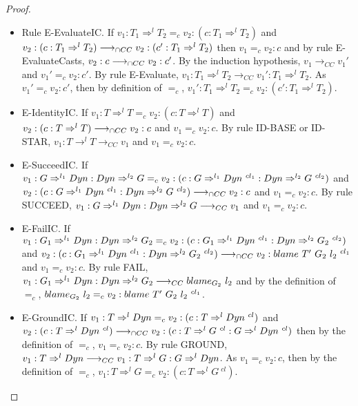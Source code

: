\documentclass[a4paper]{article}
\begin{document}
\begin{proof}
\begin{itemize}
\begin{itemize}
\begin{itemize}
            \item Rule E-EvaluateIC.
            If $v_1 : T_1 \Rightarrow^l T_2 =_c v_2 : (c : T_1 \Rightarrow^l T_2)$ and $v_2 : (c : T_1 \Rightarrow^l T_2) \longrightarrow_{\cap CC} v_2 : (c' : T_1 \Rightarrow^l T_2)$ then $v_1 =_c v_2 : c$ and by rule E-EvaluateCasts, $v_2 : c \longrightarrow_{\cap CC} v_2 : c'$.
            By the induction hypothesis, $v_1 \longrightarrow_{CC} v_1'$ and $v_1' =_c v_2 : c'$.
            By rule E-Evaluate, $v_1 : T_1 \Rightarrow^l T_2 \longrightarrow_{CC} v_1' : T_1 \Rightarrow^l T_2$.
            As $v_1' =_c v_2 : c'$, then by definition of $=_c$, $v_1' : T_1 \Rightarrow^l T_2 =_c v_2 : (c' : T_1 \Rightarrow^l T_2)$.
            \item E-IdentityIC.
            If $v_1 : T \Rightarrow^l T =_c v_2 : (c : T \Rightarrow^l T)$ and $v_2 : (c : T \Rightarrow^l T) \longrightarrow_{\cap CC} v_2 : c$ and $v_1 =_c v_2 : c$.
            By rule ID-BASE or ID-STAR, $v_1 : T \rightarrow^l T \longrightarrow_{CC} v_1$ and $v_1 =_c v_2 : c$.
            \item E-SucceedIC.
            If $v_1 : G \Rightarrow^{l_1} \Dyn : \Dyn \Rightarrow^{l_2} G =_c v_2 : (c : G \Rightarrow^{l_1} \Dyn\ ^{cl_1} : \Dyn \Rightarrow^{l_2} G\ ^{cl_2})$ and $v_2 : (c : G \Rightarrow^{l_1} Dyn\ ^{cl_1} : Dyn \Rightarrow^{l_2} G\ ^{cl_2}) \longrightarrow_{\cap CC} v_2 : c$ and $v_1 =_c v_2 : c$.
            By rule SUCCEED, $v_1 : G \Rightarrow^{l_1} Dyn : Dyn \Rightarrow^{l_2} G \longrightarrow_{CC} v_1$ and $v_1 =_c v_2 : c$.
            \item E-FailIC.
            If $v_1 : G_1 \Rightarrow^{l_1} \Dyn : \Dyn \Rightarrow^{l_2} G_2 =_c v_2 : (c : G_1 \Rightarrow^{l_1} \Dyn\ ^{cl_1} : \Dyn \Rightarrow^{l_2} G_2\ ^{cl_2})$ and $v_2 : (c : G_1 \Rightarrow^{l_1} Dyn\ ^{cl_1} : Dyn \Rightarrow^{l_2} G_2\ ^{cl_2}) \longrightarrow_{\cap CC} v_2 : blame\ T'\ G_2\ l_2\ ^{cl_1}$ and $v_1 =_c v_2 : c$.
            By rule FAIL, $v_1 : G_1 \Rightarrow^{l_1} Dyn : Dyn \Rightarrow^{l_2} G_2 \longrightarrow_{CC} blame_{G_2}\ l_2$ and by the definition of $=_c$, $blame_{G_2}\ l_2 =_c v_2 : blame\ T'\ G_2\ l_2\ ^{cl_1}$.
            \item E-GroundIC.
            If $v_1 : T \Rightarrow^l Dyn =_c v_2 : (c : T \Rightarrow^l Dyn\ ^{cl})$ and $v_2 : (c : T \Rightarrow^l Dyn\ ^{cl}) \longrightarrow_{\cap CC} v_2 : (c : T \Rightarrow^l G\ ^{cl} : G \Rightarrow^l Dyn\ ^{cl})$ then by the definition of $=_c$, $v_1 =_c v_2 : c$.
            By rule GROUND, $v_1 : T \Rightarrow^l Dyn \longrightarrow_{CC} v_1 : T \Rightarrow^l G : G \Rightarrow^l Dyn$.
            As $v_1 =_c v_2 : c$, then by the definition of $=_c$, $v_1 : T \Rightarrow^l G =_c v_2 : (c : T \Rightarrow^l G\ ^{cl})$.

\end{itemize}
\end{itemize}
\end{itemize}
\end{proof}
\end{document}
